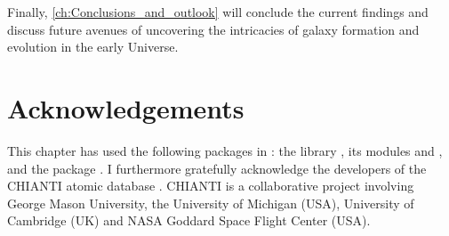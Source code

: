 Finally, \cref{ch:Conclusions_and_outlook} will conclude the current findings and discuss future avenues of uncovering the intricacies of galaxy formation and evolution in the early Universe.

\section*{Acknowledgements}

This chapter has used the following packages in : the  library \citep{Jones2001}, its modules  \citep{2011CSE....13b..22V} and  \citep{Hunter2007}, and the  package \citep{2013A&A...558A..33A, 2018AJ....156..123A}. I furthermore gratefully acknowledge the developers of the CHIANTI atomic database \citep{1997A&AS..125..149D, 2021ApJ...909...38D}. CHIANTI is a collaborative project involving George Mason University, the University of Michigan (USA), University of Cambridge (UK) and NASA Goddard Space Flight Center (USA).